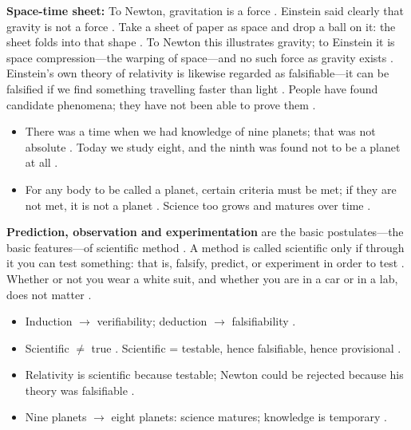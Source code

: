 \begin{ExampleBox}
\textbf{Space-time sheet:} To Newton, gravitation is a force . Einstein said clearly that gravity is not a force . Take a sheet of paper as space and drop a ball on it: the sheet folds into that shape . To Newton this illustrates gravity; to Einstein it is space compression---the warping of space---and no such force as gravity exists . Einstein's own theory of relativity is likewise regarded as falsifiable---it can be falsified if we find something travelling faster than light . People have found candidate phenomena; they have not been able to prove them .
\end{ExampleBox}

\begin{DataFact}
\begin{itemize}
    \item There was a time when we had knowledge of nine planets; that was not absolute . Today we study eight, and the ninth was found not to be a planet at all .
    \item For any body to be called a planet, certain criteria must be met; if they are not met, it is not a planet . Science too grows and matures over time .
\end{itemize}
\end{DataFact}

\begin{KeyConcept}
\textbf{Prediction, observation and experimentation} are the basic postulates---the basic features---of scientific method . A method is called scientific only if through it you can test something: that is, falsify, predict, or experiment in order to test . Whether or not you wear a white suit, and whether you are in a car or in a lab, does not matter .
\end{KeyConcept}

\begin{QuickRevision}
\begin{itemize}
    \item Induction $\rightarrow$ verifiability; deduction $\rightarrow$ falsifiability .
    \item Scientific $\neq$ true . Scientific = testable, hence falsifiable, hence provisional .
    \item Relativity is scientific because testable; Newton could be rejected because his theory was falsifiable .
    \item Nine planets $\rightarrow$ eight planets: science matures; knowledge is temporary .
\end{itemize}
\end{QuickRevision}

